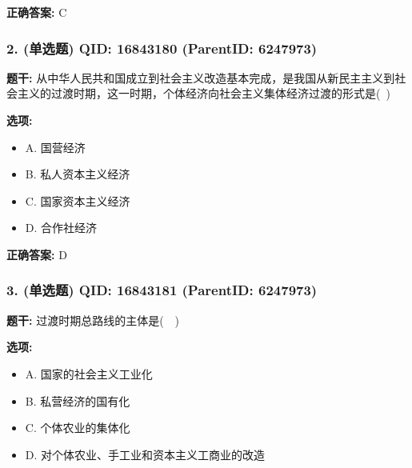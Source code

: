 \documentclass[12pt,UTF8]{ctexart}
\begin{document}
\textbf{正确答案:}
C

\vspace{0.3em}\hrulefill\vspace{0.7em}

\subsubsection*{2. (单选题) \small QID: 16843180 (ParentID: 6247973)}

\textbf{题干:}
从中华人民共和国成立到社会主义改造基本完成，是我国从新民主主义到社会主义的过渡时期，这一时期，个体经济向社会主义集体经济过渡的形式是( )



\textbf{选项:}
\begin{itemize}[leftmargin=*]

  \item A. 国营经济

  \item B. 私人资本主义经济

  \item C. 国家资本主义经济

  \item D. 合作社经济

\end{itemize}

\textbf{正确答案:}
D

\vspace{0.3em}\hrulefill\vspace{0.7em}

\subsubsection*{3. (单选题) \small QID: 16843181 (ParentID: 6247973)}

\textbf{题干:}
过渡时期总路线的主体是(  )



\textbf{选项:}
\begin{itemize}[leftmargin=*]

  \item A. 国家的社会主义工业化

  \item B. 私营经济的国有化

  \item C. 个体农业的集体化

  \item D. 对个体农业、手工业和资本主义工商业的改造

\end{itemize}
\end{document}
